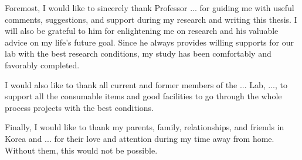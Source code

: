 Foremost, I would like to sincerely thank Professor ... for guiding me with useful comments, suggestions, and support during my research and writing this thesis. I will also be grateful to him for enlightening me on research and his valuable advice on my life's future goal. Since he always provides willing supports for our lab with the best research conditions, my study has been comfortably and favorably completed.

I would also like to thank all current and former members of the ... Lab, ..., to support all the consumable items and good facilities to go through the whole process projects with the best conditions.

Finally, I would like to thank my parents, family, relationships, and friends in Korea and ... for their love and attention during my time away from home. Without them, this would not be possible.
